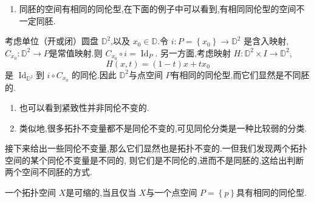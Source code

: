 \documentclass[../../几何与拓扑.tex]{subfiles}
\begin{document}
\begin{remark}
    \begin{enumerate}
        \item 同胚的空间有相同的同伦型,在下面的例子中可以看到,有相同同伦型的空间不一定同胚.
    \end{enumerate}
    
\end{remark}


\begin{example}
    考虑单位（开或闭）圆盘 \(  \mathbb{D}^{2}  \),以及 \(  x_0 \in \mathbb{D}  \).令 \(  i: P =  \left\{ x_0 \right\}\to  \mathbb{D}^{2}  \)   是含入映射,
    \(  C_{x_0}:\mathbb{D}^{2}\to P  \)是常值映射.则 \(  C_{x_0}\circ i = \operatorname{Id}_{P}  \). 
    另一方面,考虑映射 \(  H: \mathbb{D}^{2}\times I \to \mathbb{D}^{2}  \), \[
    H\left( x,t \right) = \left( 1-t \right)x+ tx_0  
    \]   是 \(  \operatorname{Id}_{\mathbb{D}^{2}}  \)到 \(  i\circ C_{x_0}  \)  的同伦.因此 \(  \mathbb{D}^{2}  \)与点空间 \(  P  \)有相同的同伦型,而它们显然是不同胚的.  

\end{example}

\begin{remark}
   \begin{enumerate}
    \item  也可以看到紧致性并非同伦不变的.
    \item 类似地,很多拓扑不变量都不是同伦不变的,可见同伦分类是一种比较弱的分类.
   \end{enumerate}
   
\end{remark}

\hspace*{\fill} 


接下来给出一些同伦不变量,那么它们显然也是拓扑不变的.一但我们发现两个拓扑空间的某个同伦不变量是不同的,
则它们是不同伦的,进而不是同胚的,这给出判断两个空间不同胚的方式.





\begin{theorem}
    一个拓扑空间 \(  X  \)是可缩的,当且仅当 \(  X  \)与一个点空间 \(  P =  \left\{ p \right\}  \)具有相同的同伦型.   
\end{theorem}
\end{document}
